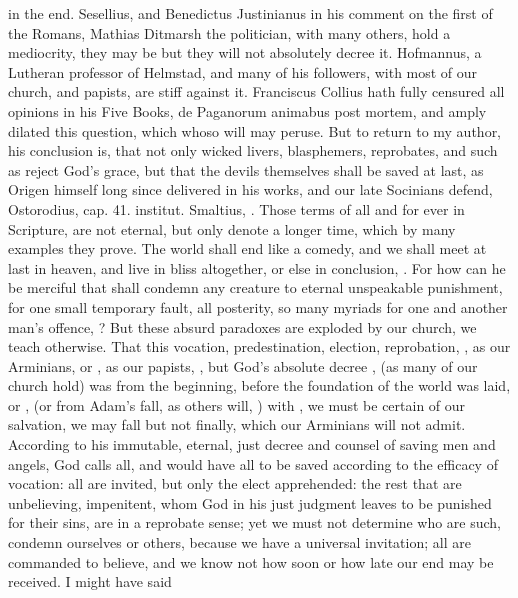 {in the end. Sesellius, and Benedictus Justinianus in his comment on the
first of the Romans, Mathias Ditmarsh the politician, with many others,
hold a mediocrity, they may be  but they will not
absolutely decree it. Hofmannus, a Lutheran professor of Helmstad, and
many of his followers, with most of our church, and papists, are stiff
against it. Franciscus Collius hath fully censured all opinions in his
Five Books, \textlatin{de Paganorum animabus post mortem}, and amply dilated this
question, which whoso will may peruse. But to return to my author, his
conclusion is, that not only wicked livers, blasphemers, reprobates,
and such as reject God's grace, but that the devils themselves shall be
saved at last, as Origen himself long since delivered in his
works, and our late Socinians defend, Ostorodius, \textlatin{cap. 41.
institut.} Smaltius, \etc{}. Those terms of all and for ever in Scripture,
are not eternal, but only denote a longer time, which by many examples
they prove. The world shall end like a comedy, and we shall meet at
last in heaven, and live in bliss altogether, or else in conclusion, . For how can he be merciful that shall condemn any
creature to eternal unspeakable punishment, for one small temporary
fault, all posterity, so many myriads for one and another man's
offence, ? But these absurd paradoxes are exploded
by our church, we teach otherwise. That this vocation, predestination,
election, reprobation, , as our
Arminians, or , as our papists, , but God's absolute decree , (as many
of our church hold) was from the beginning, before the foundation of
the world was laid, or , (or from Adam's fall, as others
will, ) with , we must be certain of our salvation, we may fall but not
finally, which our Arminians will not admit. According to his
immutable, eternal, just decree and counsel of saving men and angels,
God calls all, and would have all to be saved according to the efficacy
of vocation: all are invited, but only the elect apprehended: the rest
that are unbelieving, impenitent, whom God in his just judgment leaves
to be punished for their sins, are in a reprobate sense; yet we must
not determine who are such, condemn ourselves or others, because we
have a universal invitation; all are commanded to believe, and we know
not how soon or how late our end may be received. I might have said
}
